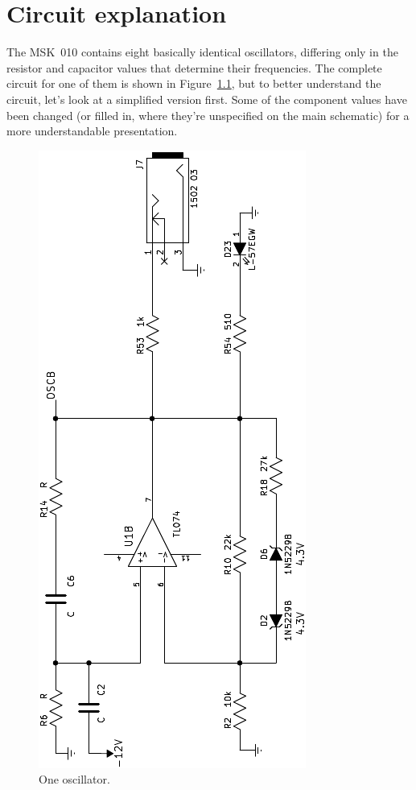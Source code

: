 
%
%
%
%
%
%

\chapter{Circuit explanation}

The MSK~010 contains eight basically identical oscillators, differing only
in the resistor and capacitor values that determine their frequencies.  The
complete circuit for one of them is shown in Figure~\ref{fig:oscillator},
but to better understand the circuit, let's look at a simplified version
first.  Some of the component values have been changed (or filled in, where
they're unspecified on the main schematic) for a more understandable
presentation.

{\centering\par}

\begin{figure}
\texdependspdfworkaround
\centering\includegraphics[height=\linewidth,angle=-90]{oscillator}\par
\caption{One oscillator.}\label{fig:oscillator}
\end{figure}

